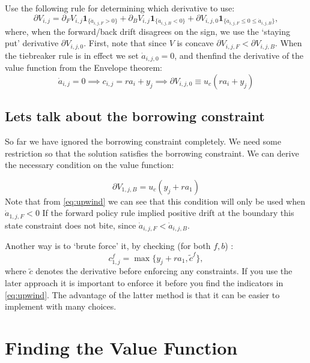 \documentclass[12pt]{article}
\DeclareMathOperator{\1}{\mathbbm{1}}
\begin{document}
	Use the following rule for determining which derivative to use:
	\begin{equation}\label{eq:upwind}
	\partial V_{i,j}=\partial_F V_{i,j}\mathbf{1}_{\{\dot a_{i,j,F}>0\}} + \partial_B V_{i,j}\mathbf{1}_{\{\dot a_{i,j,B}<0\}} +  {\partial V_{i,j,0}}\mathbf{1}_{\{\dot a_{i,j,F}\le 0 \le \dot a_{i,j,B}\}},
	\end{equation}
	where, when the forward/back drift disagrees on the sign, we use the `staying put' derivative $\partial V_{i,j,0}$. First, note that since $V$ is concave $\partial V_{i,j,F}<\partial V_{i,j,B}$. When the tiebreaker rule is in effect we set $\dot a_{i,j,0}=0$, and thenfind the derivative of the value function from the Envelope theorem: \begin{equation}
    \dot a_{i,j} = 0 \implies c_{i,j} = r a_i + y_j \implies \partial	V_{i,j,0} \equiv u_c(r a_i+y_j)  
	\end{equation}
	
	\subsection{Lets talk about the borrowing constraint}
	\label{sec:borrowingconstr}
So far we have ignored the borrowing constraint completely. We need some restriction so that the solution satisfies the borrowing constraint. We can derive the necessary condition on the value function:

	\begin{equation*}
		\partial V_{1,j,B} = u_c(y_j + r a_1)
	\end{equation*}
	Note that from \eqref{eq:upwind} we can see that this condition will only be used when $\dot a_{1,j,F}<0$ If the forward policy rule implied positive drift at the boundary this state constraint does not bite, since $\dot a_{i,j,F}<\dot a_{i,j,B}$.
	
	Another way is to `brute force' it, by checking 	(for both $f,b$) :
	$$c_{1,j}^f=\max\{y_j+r a_1,\tilde c^f\},$$
where $\tilde c$ denotes the derivative before enforcing any constraints. If you use the later approach it is important to enforce it before you find the indicators in \eqref{eq:upwind}. The advantage of the latter method is that it can be easier to implement with many choices.
	
	
	
\section{Finding the Value Function}
\end{document}
